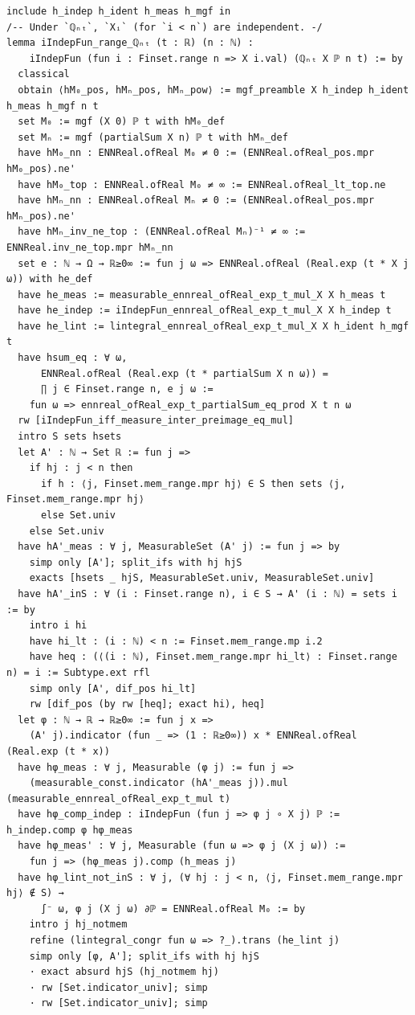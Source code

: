\begin{lstlisting}
include h_indep h_ident h_meas h_mgf in
/-- Under `ℚₙₜ`, `Xᵢ` (for `i < n`) are independent. -/
lemma iIndepFun_range_ℚₙₜ (t : ℝ) (n : ℕ) :
    iIndepFun (fun i : Finset.range n => X i.val) (ℚₙₜ X ℙ n t) := by
  classical
  obtain ⟨hM₀_pos, hMₙ_pos, hMₙ_pow⟩ := mgf_preamble X h_indep h_ident h_meas h_mgf n t
  set M₀ := mgf (X 0) ℙ t with hM₀_def
  set Mₙ := mgf (partialSum X n) ℙ t with hMₙ_def
  have hM₀_nn : ENNReal.ofReal M₀ ≠ 0 := (ENNReal.ofReal_pos.mpr hM₀_pos).ne'
  have hM₀_top : ENNReal.ofReal M₀ ≠ ∞ := ENNReal.ofReal_lt_top.ne
  have hMₙ_nn : ENNReal.ofReal Mₙ ≠ 0 := (ENNReal.ofReal_pos.mpr hMₙ_pos).ne'
  have hMₙ_inv_ne_top : (ENNReal.ofReal Mₙ)⁻¹ ≠ ∞ := ENNReal.inv_ne_top.mpr hMₙ_nn
  set e : ℕ → Ω → ℝ≥0∞ := fun j ω => ENNReal.ofReal (Real.exp (t * X j ω)) with he_def
  have he_meas := measurable_ennreal_ofReal_exp_t_mul_X X h_meas t
  have he_indep := iIndepFun_ennreal_ofReal_exp_t_mul_X X h_indep t
  have he_lint := lintegral_ennreal_ofReal_exp_t_mul_X X h_ident h_mgf t
  have hsum_eq : ∀ ω,
      ENNReal.ofReal (Real.exp (t * partialSum X n ω)) =
      ∏ j ∈ Finset.range n, e j ω :=
    fun ω => ennreal_ofReal_exp_t_partialSum_eq_prod X t n ω
  rw [iIndepFun_iff_measure_inter_preimage_eq_mul]
  intro S sets hsets
  let A' : ℕ → Set ℝ := fun j =>
    if hj : j < n then
      if h : ⟨j, Finset.mem_range.mpr hj⟩ ∈ S then sets ⟨j, Finset.mem_range.mpr hj⟩
      else Set.univ
    else Set.univ
  have hA'_meas : ∀ j, MeasurableSet (A' j) := fun j => by
    simp only [A']; split_ifs with hj hjS
    exacts [hsets _ hjS, MeasurableSet.univ, MeasurableSet.univ]
  have hA'_inS : ∀ (i : Finset.range n), i ∈ S → A' (i : ℕ) = sets i := by
    intro i hi
    have hi_lt : (i : ℕ) < n := Finset.mem_range.mp i.2
    have heq : (⟨(i : ℕ), Finset.mem_range.mpr hi_lt⟩ : Finset.range n) = i := Subtype.ext rfl
    simp only [A', dif_pos hi_lt]
    rw [dif_pos (by rw [heq]; exact hi), heq]
  let φ : ℕ → ℝ → ℝ≥0∞ := fun j x =>
    (A' j).indicator (fun _ => (1 : ℝ≥0∞)) x * ENNReal.ofReal (Real.exp (t * x))
  have hφ_meas : ∀ j, Measurable (φ j) := fun j =>
    (measurable_const.indicator (hA'_meas j)).mul (measurable_ennreal_ofReal_exp_t_mul t)
  have hφ_comp_indep : iIndepFun (fun j => φ j ∘ X j) ℙ := h_indep.comp φ hφ_meas
  have hφ_meas' : ∀ j, Measurable (fun ω => φ j (X j ω)) :=
    fun j => (hφ_meas j).comp (h_meas j)
  have hφ_lint_not_inS : ∀ j, (∀ hj : j < n, ⟨j, Finset.mem_range.mpr hj⟩ ∉ S) →
      ∫⁻ ω, φ j (X j ω) ∂ℙ = ENNReal.ofReal M₀ := by
    intro j hj_notmem
    refine (lintegral_congr fun ω => ?_).trans (he_lint j)
    simp only [φ, A']; split_ifs with hj hjS
    · exact absurd hjS (hj_notmem hj)
    · rw [Set.indicator_univ]; simp
    · rw [Set.indicator_univ]; simp
\end{lstlisting}
